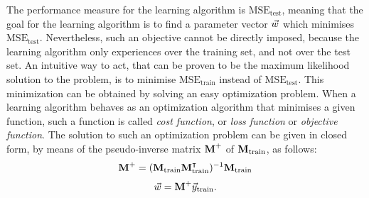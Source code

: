 The performance measure for the learning algorithm is $\mathrm{MSE_{test}}$, meaning that the goal for the learning algorithm is to find a parameter vector $\vec{w}$ which minimises $\mathrm{MSE_{test}}$. Nevertheless, such an objective cannot be directly imposed, because the learning algorithm only experiences over the training set, and not over the test set. An intuitive way to act, that can be proven to be the maximum likelihood solution to the problem, is to minimise  $\mathrm{MSE_{train}}$ instead of $\mathrm{MSE_{test}}$. This minimization can be obtained by solving an easy optimization problem. When a learning algorithm behaves as an optimization algorithm that minimises a given function, such a function is called \emph{cost function}, or \emph{loss function} or \emph{objective function}. 
The solution to such an optimization problem can be given in closed form, by means of the pseudo-inverse matrix $\textbf{M}^+$ of $\textbf{M}_{\text{train}}$, as follows:
\begin{equation}
\textbf{M}^+ = (\textbf{M}_{\text{train}}\textbf{M}_{\text{train}}^\intercal)^{-1}\textbf{M}_{\text{train}}
\end{equation}
\begin{equation}
\vec{w} = \textbf{M}^+\vec{y}_{\text{train}}.
\end{equation}

